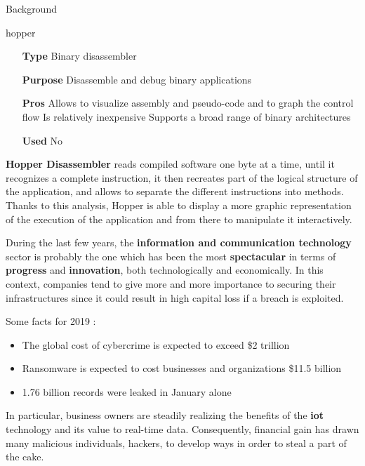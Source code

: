\begin{chaptercover}{Background}
\begin{solutiondata}{hopper}
\begin{itemize}[labelsep=1cm]
  \item [\textbf{Type}] Binary disassembler
  \item [\textbf{Purpose}] Disassemble and debug binary applications
  \item [\textbf{Pros}] Allows to visualize assembly and pseudo-code and to graph the control flow \newline Is relatively inexpensive \newline Supports a broad range of binary architectures
  \item [\textbf{Used}] No
\end{itemize}
\end{solutiondata}

\textbf{Hopper Disassembler} \cite{hopper} reads compiled software one byte at a time, until it recognizes a complete instruction, it then recreates part of the logical structure of the application, and allows to separate the different instructions into methods. Thanks to this analysis, Hopper is able to display a more graphic representation of the execution of the application and from there to manipulate it interactively.

\begin{summary}
During the last few years, the \textbf{information and communication technology} sector is probably the one which has been the most \textbf{spectacular} in terms of \textbf{progress} and \textbf{innovation}, both technologically and economically. In this context, companies tend to give more and more importance to securing their infrastructures since it could result in high capital loss if a breach is exploited.

Some facts for 2019 : \cite{facts-and-figures} \vspace{-.3cm}
\begin{itemize}[itemsep=.1cm,labelsep=.1cm]
  \item The global cost of cybercrime is expected to exceed \$2 trillion
  \item Ransomware is expected to cost businesses and organizations \$11.5 billion
  \item 1.76 billion records were leaked in January alone
\end{itemize}

In particular, business owners are steadily realizing the benefits of the \textbf{\acrfull{iot}} technology and its value to real-time data. Consequently, financial gain has drawn many malicious individuals, hackers, to develop ways in order to steal a part of the cake.


\end{summary}
\end{chaptercover}
